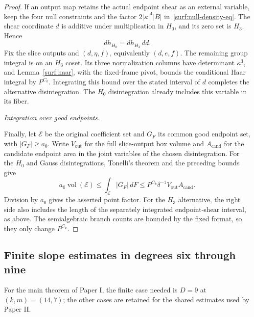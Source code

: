 \documentclass[11pt]{amsart}
\theoremstyle{definition}
\theoremstyle{remark}
\numberwithin{equation}{section}
\begin{document}
\begin{proof}
If an output map retains the actual endpoint shear as an external variable, keep the four null constraints and the factor $2|\kappa|^4|B|$ in~\eqref{surf:null-density-eq}. The shear coordinate $d$ is additive under multiplication in $H_0$, and its zero set is $H_3$. Hence
\[
dh_{H_0}=dh_{H_3}\,dd.
\]
Fix the slice outputs and $(d,\eta,f)$, equivalently $(d,e,f)$. The remaining group integral is on an $H_3$ coset. Its three normalization columns have determinant $\kappa^3$, and Lemma~\ref{surf:haar}, with the fixed-frame pivot, bounds the conditional Haar integral by $P^{C_k}$. Integrating this bound over the stated interval of $d$ completes the alternative disintegration. The $H_0$ disintegration already includes this variable in its fiber.

\par\medskip\noindent\textit{Integration over good endpoints.}\par\nobreak\smallskip

Finally, let $\mathcal E$ be the original coefficient set and $G_F$ its common good endpoint set, with $|G_F|\ge a_0$. Write $V_{\mathrm{out}}$ for the full slice-output box volume and $A_{\mathrm{cand}}$ for the candidate endpoint area in the joint variables of the chosen disintegration. For the $H_0$ and Gauss disintegrations, Tonelli's theorem and the preceding bounds give
\[
a_0\operatorname{vol}(\mathcal E)\le\int_{\mathcal E}|G_F|\,dF\le P^{C_k}\delta^{-1}V_{\mathrm{out}}A_{\mathrm{cand}}.
\]
Division by $a_0$ gives the asserted point factor. For the $H_3$ alternative, the right side also includes the length of the separately integrated endpoint-shear interval, as above. The semialgebraic branch counts are bounded by the fixed format, so they only change $P^{C_k}$.
\end{proof}

\subsection{Finite slope estimates in degrees six through nine}\label{atlas:slopes}\label{low:78:s38det:section}\label{low:9:h9d:slope-section}\label{low:78:h3n:det7-section}

For the main theorem of Paper I, the finite case needed is $D=9$ at $(k,m)=(14,7)$; the other cases are retained for the shared estimates used by Paper II.
\end{document}
